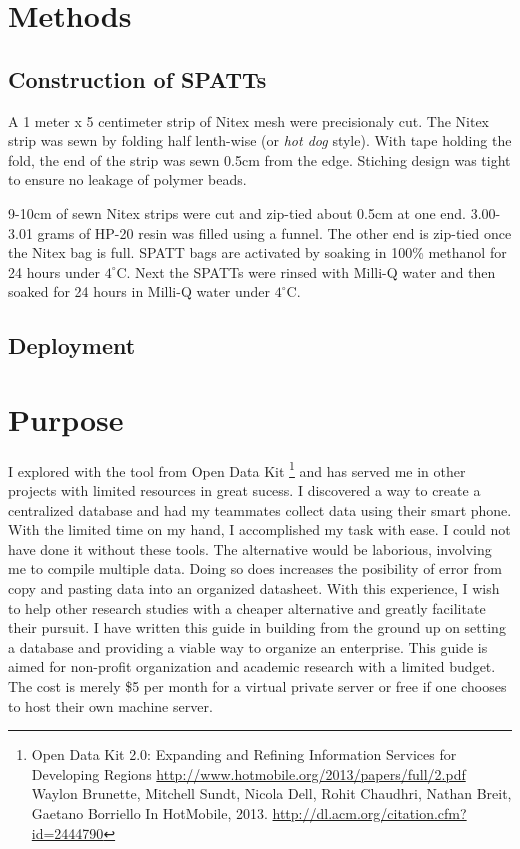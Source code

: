 \documentclass{ou-thesis}
\begin{document}
\begin{appendix}
\section*{Methods}

\subsection*{Construction of SPATTs}

A 1 meter x 5 centimeter strip of Nitex mesh were precisionaly cut. The Nitex strip was sewn by folding half lenth-wise (or \emph{hot dog} style). With tape holding the fold, the end of the strip was sewn 0.5cm from the edge. Stiching design was tight to ensure no leakage of polymer beads.

9-10cm of sewn Nitex strips were cut and zip-tied about 0.5cm at one end. 3.00-3.01 grams of HP-20 resin was filled using a funnel. The other end is zip-tied once the Nitex bag is full. SPATT bags are activated by soaking in 100\% methanol for 24 hours under $4^\circ$C. Next the SPATTs were rinsed with Milli-Q water and then soaked for 24 hours in Milli-Q water under $4^\circ$C.



\subsection*{Deployment}




\section*{Purpose}


\indent I explored with the tool from Open Data Kit \footnote{Open Data Kit 2.0: Expanding and Refining Information Services for Developing Regions \url{http://www.hotmobile.org/2013/papers/full/2.pdf} Waylon Brunette, Mitchell Sundt, Nicola Dell, Rohit Chaudhri, Nathan Breit, Gaetano Borriello In HotMobile, 2013. \url{http://dl.acm.org/citation.cfm?id=2444790}} and has served me in other projects with limited resources  in great sucess. I discovered a way to create a centralized database and had my teammates collect data using their smart phone. With the limited time on my hand, I accomplished my task with ease. I could not have done it without these tools. The alternative would be laborious, involving me to compile multiple data. Doing so does increases the posibility of error from copy and pasting data into an organized datasheet.
With this experience, I wish to help other research studies with a cheaper alternative and greatly facilitate their pursuit. I have written this guide in building from the ground up on setting a database and providing a viable way to organize an enterprise. This guide is aimed for non-profit organization and academic research with a limited budget. The cost is merely \$5 per month for a virtual private server or free if one chooses to host their own machine server.


\end{appendix}
\end{document}
